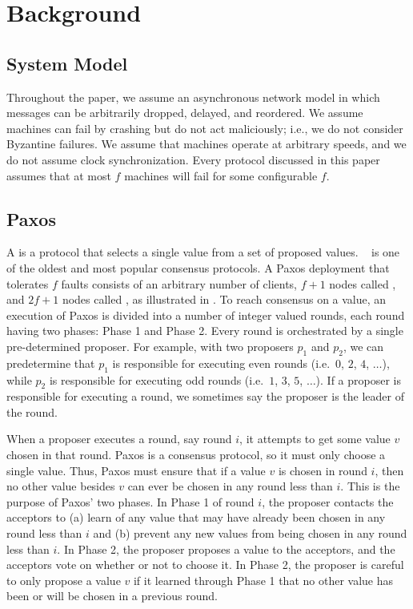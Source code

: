 \section{Background}

\subsection{System Model}
Throughout the paper, we assume an asynchronous network model in which messages
can be arbitrarily dropped, delayed, and reordered. We assume machines can fail
by crashing but do not act maliciously; i.e., we do not consider Byzantine
failures. We assume that machines operate at arbitrary speeds, and we do not
assume clock synchronization. Every protocol discussed in this paper assumes
that at most $f$ machines will fail for some configurable $f$.

\subsection{Paxos}
A  is a protocol that selects a single value from a
set of proposed values. ~\cite{lamport1998part,
lamport2001paxos} is one of the oldest and most popular consensus protocols. A
Paxos deployment that tolerates $f$ faults consists of an arbitrary number of
clients, $f+1$ nodes called , and $2f+1$ nodes called
, as illustrated in .
%
To reach consensus on a value, an execution of Paxos is divided into a number
of integer valued rounds, each round having two phases: Phase 1 and Phase 2.
Every round is orchestrated by a single pre-determined proposer. For example,
with two proposers $p_1$ and $p_2$, we can predetermine that $p_1$ is
responsible for executing even rounds (i.e.\ $0$, $2$, $4$, $\ldots$), while
$p_2$ is responsible for executing odd rounds (i.e.\ $1$, $3$, $5$, $\ldots$).
If a proposer is responsible for executing a round, we sometimes say the
proposer is the leader of the round.

{}

When a proposer executes a round, say round $i$, it attempts to get some value
$v$ chosen in that round. Paxos is a consensus protocol, so it must only choose
a single value. Thus, Paxos must ensure that if a value $v$ is chosen in round
$i$, then no other value besides $v$ can ever be chosen in any round less than
$i$. This is the purpose of Paxos' two phases. In Phase 1 of round $i$, the
proposer contacts the acceptors to (a) learn of any value that may have already
been chosen in any round less than $i$ and (b) prevent any new values from
being chosen in any round less than $i$. In Phase 2, the proposer proposes a
value to the acceptors, and the acceptors vote on whether or not to choose it.
In Phase 2, the proposer is careful to only propose a value $v$ if it learned
through Phase 1 that no other value has been or will be chosen in a previous
round.

